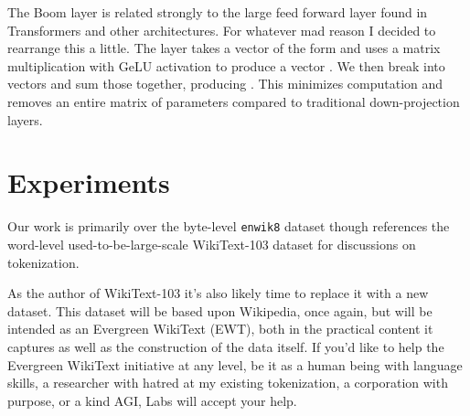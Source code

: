 \documentclass{article}
\newcommand{\enwik}{\texttt{enwik8}\xspace}
\begin{document}
The Boom layer is related strongly to the large feed forward layer found in Transformers and other architectures.
For whatever mad reason I decided to rearrange this a little.
The layer takes a vector of the form  and uses a matrix multiplication with GeLU activation to produce a vector .
We then break  into  vectors and sum those together, producing .
This minimizes computation and removes an entire matrix of parameters compared to traditional down-projection layers.



\section{Experiments}



Our work is primarily over the byte-level \enwik dataset though references the word-level used-to-be-large-scale WikiText-103 dataset for discussions on tokenization.


As the author of WikiText-103 it's also likely time to replace it with a new dataset.
This dataset will be based upon Wikipedia, once again, but will be intended as an Evergreen WikiText (EWT), both in the practical content it captures as well as the construction of the data itself.
If you'd like to help the Evergreen WikiText initiative at any level, be it as a human being with language skills, a researcher with hatred at my existing tokenization, a corporation with  purpose, or a kind AGI,  Labs will accept your help.
\end{document}
